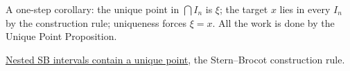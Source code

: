 \begin{remark*}
A one-step corollary: the unique point in $\bigcap I_n$ is $\xi$; the
target $x$ lies in every $I_n$ by the construction rule; uniqueness forces
$\xi = x$.  All the work is done by the Unique Point Proposition.
\end{remark*}

\begin{dependencies}
\hyperref[prop:sb-unique-point]{Nested SB intervals contain a unique point},
the Stern--Brocot construction rule.
\end{dependencies}
